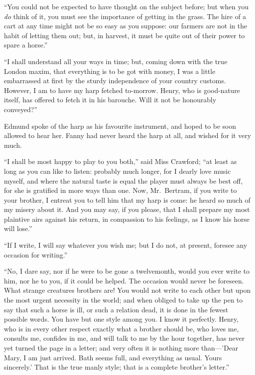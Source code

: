 ``You could not be expected to have thought on the subject before;
but when you \emph{do} think of it, you must see the importance
of getting in the grass.  The hire of a cart at any time
might not be so easy as you suppose:  our farmers are
not in the habit of letting them out; but, in harvest,
it must be quite out of their power to spare a horse.''

``I shall understand all your ways in time; but, coming down
with the true London maxim, that everything is to be
got with money, I was a little embarrassed at first
by the sturdy independence of your country customs.
However, I am to have my harp fetched to-morrow. Henry,
who is good-nature itself, has offered to fetch
it in his barouche.  Will it not be honourably conveyed?''

Edmund spoke of the harp as his favourite instrument,
and hoped to be soon allowed to hear her.  Fanny had never
heard the harp at all, and wished for it very much.

``I shall be most happy to play to you both,'' said Miss
Crawford; ``at least as long as you can like to listen:
probably much longer, for I dearly love music myself,
and where the natural taste is equal the player must
always be best off, for she is gratified in more ways
than one.  Now, Mr.\ Bertram, if you write to your brother,
I entreat you to tell him that my harp is come:
he heard so much of my misery about it.  And you may say,
if you please, that I shall prepare my most plaintive
airs against his return, in compassion to his feelings,
as I know his horse will lose.''

``If I write, I will say whatever you wish me; but I do not,
at present, foresee any occasion for writing.''

``No, I dare say, nor if he were to be gone a twelvemonth,
would you ever write to him, nor he to you, if it could
be helped.  The occasion would never be foreseen.
What strange creatures brothers are!  You would not write
to each other but upon the most urgent necessity in the world;
and when obliged to take up the pen to say that such a horse
is ill, or such a relation dead, it is done in the fewest
possible words.  You have but one style among you.
I know it perfectly.  Henry, who is in every other respect
exactly what a brother should be, who loves me, consults me,
confides in me, and will talk to me by the hour together,
has never yet turned the page in a letter; and very often
it is nothing more than---'Dear Mary, I am just arrived.
Bath seems full, and everything as usual.  Yours sincerely.'
That is the true manly style; that is a complete
brother's letter.''

